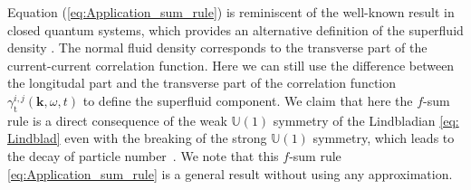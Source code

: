 \documentclass[aps,prl,twocolumn,superscriptaddress,]{revtex4-1}
\begin{document}
Equation (\ref{eq:Application_sum_rule}) is reminiscent of the well-known result
in closed quantum systems, which provides an alternative definition
of the superfluid density \citep{Mathematical_method_SF_1968}. The
normal fluid density corresponds to the transverse part of the current-current
correlation function. Here we can still use the difference between
the longitudal part and the transverse part of the correlation function
$\gamma_{\mathrm{t}}^{i,j}(\bm{k},\omega,t)$ to define the superfluid
component.
We claim that here the $f$-sum rule is a direct consequence of the weak $\mathbb{U}(1)$ symmetry of the Lindbladian \eqref{eq: Lindblad} even with the breaking of the strong $\mathbb{U}(1)$ symmetry, which leads to the decay of particle number~\cite{Albert2014,Sieberer_2016}. We note that this $f$-sum rule \eqref{eq:Application_sum_rule} is a general result without using any approximation.  
\end{document}
